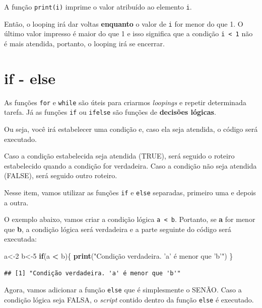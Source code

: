 \documentclass[
]{book}
\newenvironment{Shaded}{\begin{snugshade}}{\end{snugshade}}
\newcommand{\ControlFlowTok}[1]{\textcolor[rgb]{0.13,0.29,0.53}{\textbf{#1}}}
\newcommand{\DecValTok}[1]{\textcolor[rgb]{0.00,0.00,0.81}{#1}}
\newcommand{\KeywordTok}[1]{\textcolor[rgb]{0.13,0.29,0.53}{\textbf{#1}}}
\newcommand{\NormalTok}[1]{#1}
\newcommand{\OperatorTok}[1]{\textcolor[rgb]{0.81,0.36,0.00}{\textbf{#1}}}
\newcommand{\StringTok}[1]{\textcolor[rgb]{0.31,0.60,0.02}{#1}}
\begin{document}
A função \texttt{print(i)} imprime o valor atribuído ao elemento
\texttt{i}.

Então, o looping irá dar voltas \textbf{enquanto} o valor de \texttt{i}
for menor do que 1. O último valor impresso é maior do que 1 e isso
significa que a condição \texttt{i\ \textless{}\ 1} não é mais atendida,
portanto, o looping irá se encerrar.

\hypertarget{if---else}{%
\section{if - else}\label{if---else}}

As funções \texttt{for} e \texttt{while} são úteis para criarmos
\emph{loopings} e repetir determinada tarefa. Já as funções \texttt{if}
ou \texttt{ifelse} são funções de \textbf{decisões lógicas}.

Ou seja, você irá estabelecer uma condição e, caso ela seja atendida, o
código será executado.

Caso a condição estabelecida seja atendida (TRUE), será seguido o
roteiro estabelecido quando a condição for verdadeira. Caso a condição
não seja atendida (FALSE), será seguido outro roteiro.

Nesse item, vamos utilizar as funções \texttt{if} e \texttt{else}
separadas, primeiro uma e depois a outra.

O exemplo abaixo, vamos criar a condição lógica
\texttt{a\ \textless{}\ b}. Portanto, se \textbf{a} for menor que
\textbf{b}, a condição lógica será verdadeira e a parte seguinte do
código será executada:

\begin{Shaded}
\begin{Highlighting}[]
\NormalTok{a<-}\DecValTok{2}
\NormalTok{b<-}\DecValTok{5}
\ControlFlowTok{if}\NormalTok{(a }\OperatorTok{<}\StringTok{ }\NormalTok{b)\{}
  \KeywordTok{print}\NormalTok{(}\StringTok{"Condição verdadeira. 'a' é menor que 'b'"}\NormalTok{)}
\NormalTok{\}}
\end{Highlighting}
\end{Shaded}

\begin{verbatim}
## [1] "Condição verdadeira. 'a' é menor que 'b'"
\end{verbatim}

Agora, vamos adicionar a função \texttt{else} que é simplesmente o
SENÃO. Caso a condição lógica seja FALSA, o \emph{script} contido dentro
da função \texttt{else} é executado.
\end{document}
